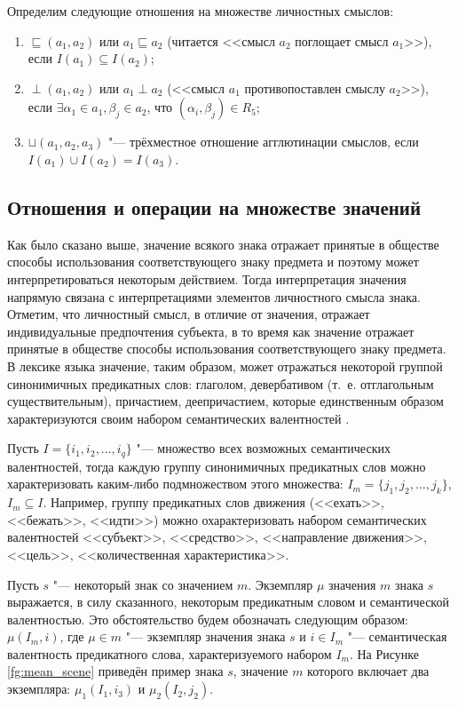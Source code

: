 Определим следующие отношения на множестве личностных смыслов:
\begin{enumerate}
	\item $\sqsubseteq(a_1,a_2)$ или $a_1\sqsubseteq a_2$ (читается <<смысл $a_2$ поглощает смысл $a_1$>>), если $I(a_1)\subseteq I(a_2)$;
	\item $\perp(a_1,a_2)$  или $a_1\perp a_2$ (<<смысл $a_1$ противопоставлен смыслу $a_2$>>), если $\exists\alpha_1\in a_1,\beta_j\in a_2$, что $(\alpha_i,\beta_j)\in R_5$;
	\item $\sqcup(a_1,a_2,a_3)$ "--- трёхместное отношение агглютинации смыслов, если $I(a_1)\cup I(a_2)=I(a_3)$.
\end{enumerate}

\subsection{Отношения и операции на множестве значений}

Как было сказано выше, значение всякого знака отражает принятые в обществе способы использования соответствующего знаку предмета и поэтому может интерпретироваться некоторым действием. Тогда интерпретация значения напрямую связана с интерпретациями элементов личностного смысла знака. Отметим, что личностный смысл, в отличие от значения, отражает индивидуальные предпочтения субъекта, в то время как значение отражает принятые в обществе способы использования соответствующего знаку предмета. В лексике языка значение, таким образом, может отражаться некоторой группой синонимичных предикатных слов: глаголом, девербативом (т.~е. отглагольным существительным), причастием, деепричастием, которые единственным образом характеризуются своим набором семантических валентностей \cite{Schank1972}.

Пусть $I=\{i_1,i_2,\dots,i_q\}$ "--- множество всех возможных семантических валентностей, тогда каждую группу синонимичных предикатных слов можно характеризовать каким-либо подмножеством этого множества: $I_m=\{j_1,j_2,\dots,j_k\}$, $I_m\subseteq I$. Например, группу предикатных слов движения (<<ехать>>, <<бежать>>, <<идти>>) можно охарактеризовать набором семантических валентностей <<субъект>>, <<средство>>, <<направление движения>>, <<цель>>, <<количественная характеристика>>. 

Пусть $s$ "--- некоторый знак со значением $m$. Экземпляр $\mu$ значения $m$ знака $s$ выражается, в силу сказанного, некоторым предикатным словом и семантической валентностью. Это обстоятельство будем обозначать следующим образом: $\mu(I_m,i)$, где $\mu\in m$ "--- экземпляр значения знака $s$ и $i\in I_m$ "--- семантическая валентность предикатного слова, характеризуемого набором $I_m$. На Рисунке \ref{fg:mean_scene} приведён пример знака $s$, значение $m$ которого включает два экземпляра: $\mu_1(I_1,i_3)$ и $\mu_2(I_2,j_2)$.

